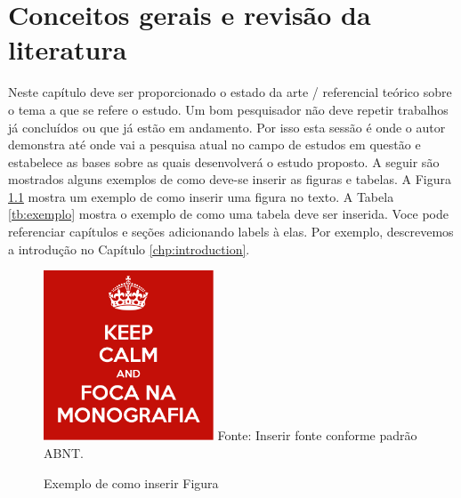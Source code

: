 \chapter{Conceitos gerais e revisão da literatura}
Neste capítulo deve ser proporcionado o estado da arte / referencial teórico
sobre o tema a que se refere o estudo. Um bom pesquisador não deve repetir
trabalhos já concluídos ou que já estão em andamento. Por isso esta sessão é
onde o autor demonstra até onde vai a pesquisa atual no campo de estudos em
questão e estabelece as bases sobre as quais desenvolverá o estudo proposto. A
seguir são mostrados alguns exemplos de como deve-se inserir as figuras e
tabelas. A Figura \ref{fig:exemplo} mostra um exemplo de como inserir uma
figura no texto. A Tabela \ref{tb:exemplo} mostra o exemplo de como uma tabela
deve ser inserida.  Voce pode referenciar capítulos e seções adicionando labels
à elas. Por exemplo, descrevemos a introdução no Capítulo
\ref{chp:introduction}.

\begin{figure}[!htb]
    \centering
    \caption{Exemplo de como inserir Figura}
    \includegraphics[width=0.45\textwidth]{images/figura.png}
    {\footnotesize Fonte: Inserir fonte conforme padrão ABNT.}
    \label{fig:exemplo}
\end{figure}



\newpage



